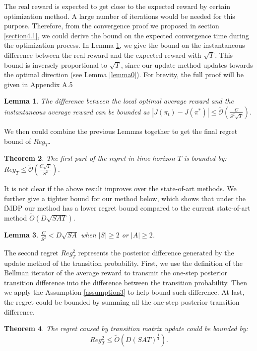 \documentclass{article}
\theoremstyle{plain}
\newtheorem{theorem}{Theorem}[section]
\newtheorem{lemma}[theorem]{Lemma}
\theoremstyle{definition}
\theoremstyle{remark}
\begin{document}
The real reward is expected to get close to the expected reward by certain optimization method. A large number of iterations would be needed for this purpose. Therefore, from the convergence proof we proposed in section \ref{section4.1}, we could derive the bound on the expected convergence time during the optimization process. In Lemma \ref{lemma3.3}, we give the bound on the instantaneous difference between the real reward and the expected reward with $\sqrt{T}$. This bound is inversely proportional to $\sqrt{T}$, since our update method updates towards the optimal direction (see Lemma \ref{lemma0}). For brevity, the full proof will be given in Appendix A.5 %
\begin{lemma}
\label{lemma3.3}
The difference between the local optimal average reward and the instantaneous average reward can be bounded as 
$|J(\pi_{t})-J(\pi^{*})| \leq \tilde{\mathcal{O}}(\frac{C}{S^{2}\sqrt{T}})$.
\end{lemma}
We then could combine the previous Lemmas together to get the final regret bound of $Reg_{T}$.
\begin{theorem}
\label{theorem4}
The first part of the regret in time horizon $T$ is bounded by:
$Reg_{T} \leq \tilde{\mathcal{O}}(\frac{C \sqrt{T}}{S^{2}})$.
\end{theorem}
It is not clear if the above result improves over the state-of-art methods. We further give a tighter bound for our method below, which shows that under the fMDP our method has a lower regret bound compared to the current state-of-art method $\tilde{O}(D\sqrt{SAT})$.
\begin{lemma}
\label{lemma4.7} 
$\frac{C}{S^{2}} < D\sqrt{SA}$ when $|S| \geq 2$ or $|A| \geq 2$.
\end{lemma}

The second regret $Reg_{T}^{2}$ represents the posterior difference generated by the update method of the transition probability. First, we use the definition of the Bellman iterator of the average reward to transmit the one-step posterior transition difference into the difference between the transition probability. Then we apply the Assumption \ref{assumption3} to help bound such difference. At last, the regret could be bounded by summing all the one-step posterior transition difference. 
\begin{theorem}
The regret caused by transition matrix update could be bounded by:
$$
Reg_{T}^{2} \leq \tilde{O}(D ( S A T)^{\frac{1}{4}}).
$$
\end{theorem}
\end{document}
